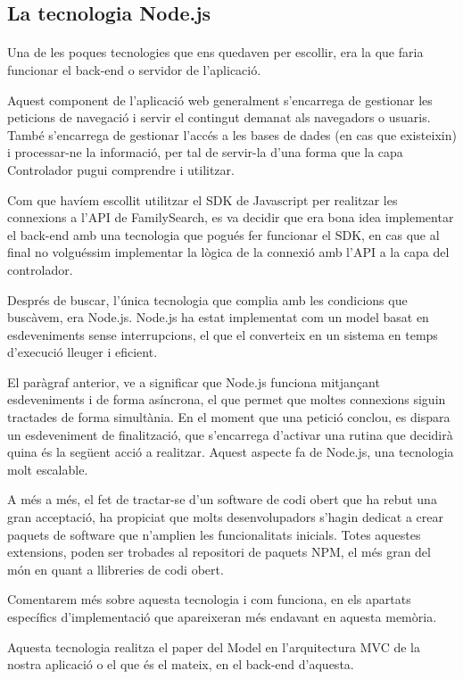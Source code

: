 \subsection{La tecnologia Node.js}

    \paragraph{}
    Una de les poques tecnologies que ens quedaven per escollir, era la que faria funcionar el back-end o servidor de l'aplicació.

    Aquest component de l'aplicació web generalment s'encarrega de gestionar les peticions de navegació i servir el contingut demanat als navegadors o usuaris. També s'encarrega de gestionar l'accés a les bases de dades (en cas que existeixin) i processar-ne la informació, per tal de servir-la d'una forma que la capa Controlador pugui comprendre i utilitzar.

    Com que havíem escollit utilitzar el SDK de Javascript per realitzar les connexions a l'API de FamilySearch, es va decidir que era bona idea implementar el back-end amb una tecnologia que pogués fer funcionar el SDK, en cas que al final no volguéssim implementar la lògica de la connexió amb l'API a la capa del controlador.

    Després de buscar, l'única tecnologia que complia amb les condicions que bus\-cà\-vem, era Node.js. Node.js ha estat implementat com un model basat en esdeveniments sense interrupcions, el que el converteix en un sistema en temps d'execució lleuger i eficient.

    El paràgraf anterior, ve a significar que Node.js funciona mitjançant esdeveniments i de forma asíncrona, el que permet que moltes connexions siguin tractades de forma simultània. En el moment que una petició conclou, es dispara un esdeveniment de finalització, que s'encarrega d'activar una rutina que decidirà quina és la següent acció a realitzar. Aquest aspecte fa de Node.js, una tecnologia molt escalable.

    A més a més, el fet de tractar-se d'un software de codi obert que ha rebut una gran acceptació, ha propiciat que molts desenvolupadors s'hagin dedicat a crear paquets de software que n'amplien les funcionalitats inicials. Totes aquestes extensions, poden ser trobades al repositori de paquets NPM, el més gran del món en quant a llibreries de codi obert.

    Comentarem més sobre aquesta tecnologia i com funciona, en els apartats específics d'implementació que apareixeran més endavant en aquesta memòria.

    Aquesta tecnologia realitza el paper del Model en l'arquitectura MVC de la nostra aplicació o el que és el mateix, en el back-end d'aquesta.
